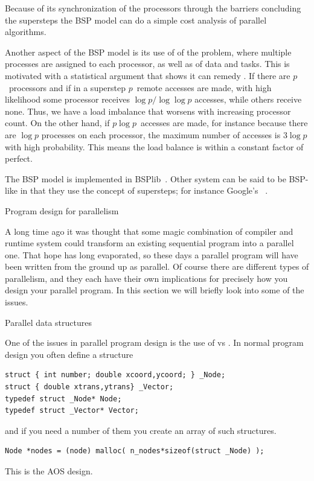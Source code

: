 Because of its synchronization of the processors through the barriers
concluding the supersteps the \ac{BSP} model can do a simple cost
analysis of parallel algorithms. 

Another aspect of the \ac{BSP} model is its use of  of the
problem, where multiple processes are assigned to each processor, as well as
 of data and tasks. This is motivated with a statistical
argument that shows it can remedy .
If there are $p$~processors and if in a superstep $p$~remote accesses are made,
with high likelihood some processor receives $\log p/\log \log p$ accesses, while
others receive none. Thus, we have a load imbalance that worsens with increasing
processor count. On the other hand, if $p\log p$~accesses are made, for
instance because there are $\log p$ processes on each processor, the maximum
number of accesses is $3\log p$ with high probability. This means the load balance 
is within a constant factor of perfect.

The \ac{BSP} model is implemented in BSPlib~\cite{BSPlib}.
Other system can be said to be BSP-like in that they use the concept
of supersteps; for instance Google's
~\cite{Pregel:podc2009}.

 {Program design for parallelism}
\label{sec:aos-soa}

A long time ago it was thought that some magic combination of 
compiler and runtime system could transform an existing sequential 
program into a parallel one. That hope has long evaporated, so these
days a parallel program will have been written from the ground up as parallel.
Of course there are different types of parallelism, and they each have
their own implications for precisely how you design your parallel program.
In this section we will briefly look into some of the issues.

 {Parallel data structures}

One of the issues in parallel program design is the use of
 vs . In normal
program design you often define a structure
\begin{verbatim}
struct { int number; double xcoord,ycoord; } _Node;
struct { double xtrans,ytrans} _Vector;
typedef struct _Node* Node;
typedef struct _Vector* Vector;
\end{verbatim}
and if you need a number of them you create an array of such structures.
\begin{verbatim}
Node *nodes = (node) malloc( n_nodes*sizeof(struct _Node) );
\end{verbatim}
This is the AOS design.

